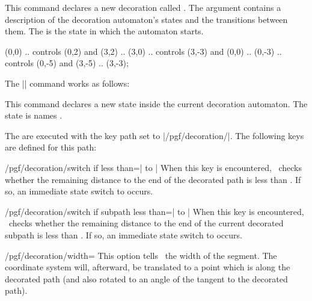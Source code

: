 \begin{command}{\pgfdeclaredecoration{}}
  This command declares a new decoration called . The
   argument contains a description of the decoration
  automaton's states and the transitions between them. The
   is the state in which the automaton starts.
  
\begin{codeexample}[]
\tikz\path[decoration=stars, star point ratio=2, star points=5,
           inner sep=0, minimum size=rnd*10pt+2pt]            
  (0,0) .. controls (0,2)  and (3,2)  .. (3,0)
        .. controls (3,-3) and (0,0)  .. (0,-3)
        .. controls (0,-5) and (3,-5) .. (3,-3);
\end{codeexample}

  The |\state| command works as follows:
  \begin{command}{\state{}}
    This command declares a new state inside the current decoration
    automaton. The state is names .

    The  are executed with the key path set to
    |/pgf/decoration/|. The following keys are defined for this path: 
    \begin{key}{/pgf/decoration/switch if less than=| to |}
      When this key is encountered, \pgfname\ checks whether the
      remaining distance to the end of the decorated path is less than
      . If so, an immediate state switch to  occurs.
    \end{key}
    \begin{key}{/pgf/decoration/switch if subpath less than=| to |}
      When this key is encountered, \pgfname\ checks whether the
      remaining distance to the end of the current decorated subpath is 
      less than . If so, an immediate state switch to 
       occurs.
    \end{key}
    \begin{key}{/pgf/decoration/width=}
      This option tells \pgfname\ the width of the segment.
      The coordinate system will, afterward, be
      translated to a point which is  along the 
      decorated path (and also rotated to an angle of the tangent
      to the decorated path).


\end{key}
\end{command}
\end{command}
